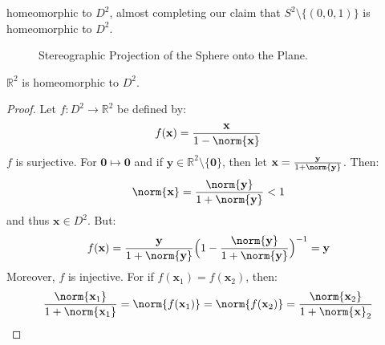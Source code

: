 \documentclass[crop=false,class=book,oneside]{standalone}
\begin{document}
            homeomorphic to $D^{2}$, almost completing our claim
            that $S^{2}\setminus\{(0,0,1)\}$
            is homeomorphic to $D^{2}$.
            \begin{figure}[H]
                \captionsetup{type=figure}
                \centering
                \caption{Stereographic Projection of the Sphere onto the Plane.}
                \label{fig:surgery_theory_stereographic_%
                       projection_of_sphere_to_plane_homeomorphism}
            \end{figure}
            \begin{theorem}
                $\mathbb{R}^{2}$ is homeomorphic to $D^{2}$.
            \end{theorem}
            \begin{proof}
                Let $f:D^{2}\rightarrow\mathbb{R}^{2}$
                be defined by:
                \begin{equation}
                    f(\mathbf{x})=\frac{\mathbf{x}}{1-\norm{\mathbf{x}}}
                \end{equation}
                $f$ is surjective.
                For $\mathbf{0}\mapsto\mathbf{0}$ and if
                $\mathbf{y}\in\mathbb{R}^2\setminus\{\mathbf{0}\}$, then let
                $\mathbf{x}=\frac{\mathbf{y}}{1+\norm{\mathbf{y}}}$.
                Then:
                \begin{equation}
                    \norm{\mathbf{x}}
                    =\frac{\norm{\mathbf{y}}}{1+\norm{\mathbf{y}}}<1
                \end{equation}
                and thus $\mathbf{x}\in D^{2}$. But:
                \begin{equation}
                    f(\mathbf{x})
                    =\frac{\mathbf{y}}{1+\norm{\mathbf{y}}}
                    \Big(
                        1-\frac{\norm{\mathbf{y}}}{1+\norm{\mathbf{y}}}
                    \Big)^{-1}
                    =\mathbf{y}
                \end{equation}
                Moreover, $f$ is injective.
                For if
                $f(\mathbf{x}_{1})=f(\mathbf{x}_{2})$,
                then:
                \begin{equation}
                    \frac{\norm{\mathbf{x}_{1}}}{1+\norm{\mathbf{x}_{1}}}
                    =\norm{f(\mathbf{x}_{1})}
                    =\norm{f(\mathbf{x}_{2})}
                    =\frac{\norm{\mathbf{x}_{2}}}{1+\norm{\mathbf{x}}_{2}}

\end{equation}
\end{proof}
\end{document}
